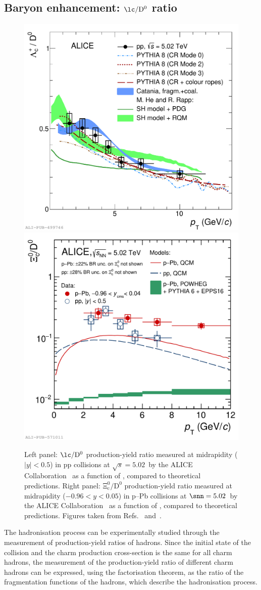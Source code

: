 \subsection{Baryon enhancement: \texorpdfstring{\boldmath$\mathrm{\lc/D^0}$}{Lc/D0} ratio}
\begin{figure}[htb]
    \centering
    \includegraphics[width=0.48\linewidth]{Figures/Chapter 2/LcD_models_withModifiedModels_ropes_coal_2.pdf}
    \includegraphics[width=0.48\linewidth]{Figures/Chapter 2/Xic0_D0_Ratio.pdf}
    \caption{Left panel: $\mathrm{\lc/D^0}$ production-yield ratio measured at midrapidity ($\lvert y\rvert < 0.5$) in pp collisions at $\sqrt{s} = 5.02$~\tev by the ALICE Collaboration~\cite{ALICE:2020wla} as a function of \pt, compared to theoretical predictions. Right panel: $\mathrm{\Xi_c^0/D^0}$ production-yield ratio measured at midrapidity ($-0.96 < y < 0.05$) in p--Pb collisions at $\snn = 5.02$~\tev by the ALICE Collaboration~\cite{ALICE:2020wla} as a function of \pt, compared to theoretical predictions. Figures taken from Refs.~\cite{ALICE:2020wla} and~\cite{ALICE:2024ozd}.}
    \label{fig:Lambda_c_D0}
\end{figure}
The hadronisation process can be experimentally studied through the measurement of production-yield ratios of hadrons. Since the initial state of the collision and the charm production cross-section is the same for all charm hadrons, the measurement of the production-yield ratio of different charm hadrons can be expressed, using the factorisation theorem, as the ratio of the fragmentation functions of the hadrons, which describe the hadronisation process. 

